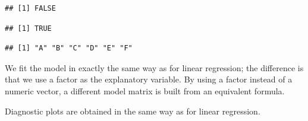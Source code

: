 \documentclass[krantz2]{krantz}\usepackage{knitr}
\begin{document}
\begin{knitrout}\footnotesize
{}\color{fgcolor}\begin{kframe}
\begin{alltt}
\hlopt{$}
\end{alltt}
\begin{verbatim}
## [1] FALSE
\end{verbatim}
\begin{alltt}
\hlopt{$}
\end{alltt}
\begin{verbatim}
## [1] TRUE
\end{verbatim}
\begin{alltt}
\hlopt{$}
\end{alltt}
\begin{verbatim}
## [1] "A" "B" "C" "D" "E" "F"
\end{verbatim}
\end{kframe}
\end{knitrout}

We fit the model in exactly the same way as for linear regression; the difference is that we use a factor as the explanatory variable. By using a factor instead of a numeric vector, a different model matrix is built from an equivalent formula.

\begin{knitrout}\footnotesize
{}\color{fgcolor}\begin{kframe}
\begin{alltt}
 \hlkwb{<-}  \hlopt{~}   
\end{alltt}
\end{kframe}
\end{knitrout}

Diagnostic plots are obtained in the same way as for linear regression.
\end{document}
